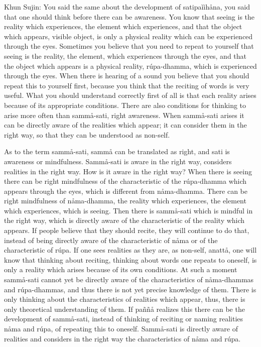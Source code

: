 \documentclass[12pt,twoside]{article}
\begin{document}
Khun Sujin: You said the same about the development of
satipa\`i\`ih{\aa}na, you said that one should think before there can
be awareness. You know that seeing is the reality which experiences,
the element which experiences, and that the object which appears,
visible object, is only a physical reality which can be experienced
through the eyes. Sometimes you believe that you need to repeat to
yourself that seeing is the reality, the element, which experiences
through the eyes, and that the object which appears is a physical
reality, r\'upa{}-dhamma, which is experienced through the eyes. When
there is hearing of a sound you believe that you should repeat this to
yourself first, because you think that the reciting of words is very
useful. What you should understand correctly first of all is that each
reality arises because of its appropriate conditions. There are also
conditions for thinking to arise more often than samm{\aa}{}-sati,
right awareness. When samm{\aa}{}-sati arises it can be directly aware
of the realities which appear; it can consider them in the right way,
so that they can be understood as non{}-self. 

As to the term samm{\aa}{}-sati, samm{\aa} can be translated as right,
and sati is awareness or mindfulness. Samm{\aa}{}-sati is aware in the
right way, considers realities in the right way. How is it aware in the
right way? When there is seeing there can be right mindfulness of the
characteristic of the r\'upa{}-dhamma which appears through the eyes,
which is different from n{\aa}ma{}-dhamma. There can be right
mindfulness of n{\aa}ma{}-dhamma, the reality which experiences, the
element which experiences, which is seeing. Then there is
samm{\aa}{}-sati which is mindful in the right way, which is directly
aware of the characteristic of the reality which appears. If people
believe that they should recite, they will continue to do that, instead
of being directly aware of the characteristic of n{\aa}ma or of the
characteristic of r\'upa. If one sees realities as they are, as
non{}-self, anatt{\aa}, one will know that thinking about reciting,
thinking about words one repeats to oneself, is only a reality which
arises because of its own conditions. At such a moment samm{\aa}{}-sati
cannot yet be directly aware of the characteristics of
n{\aa}ma{}-dhammas and r\'upa{}-dhammas, and thus there is not yet
precise knowledge of them. There is only thinking about the
characteristics of realities which appear, thus, there is only
theoretical understanding of them. If pa\~n\~n{\aa} realizes this there
can be the development of samm{\aa}{}-sati, instead of thinking of
reciting or naming realities
{\textasciigrave}{\textasciigrave}n{\aa}ma{\textquotesingle}{\textquotesingle}
and
{\textasciigrave}{\textasciigrave}r\'upa{\textquotesingle}{\textquotesingle},
of repeating this to oneself. Samm{\aa}{}-sati is directly aware of
realities and considers in the right way the characteristics of
n{\aa}ma and r\'upa. 
\end{document}
